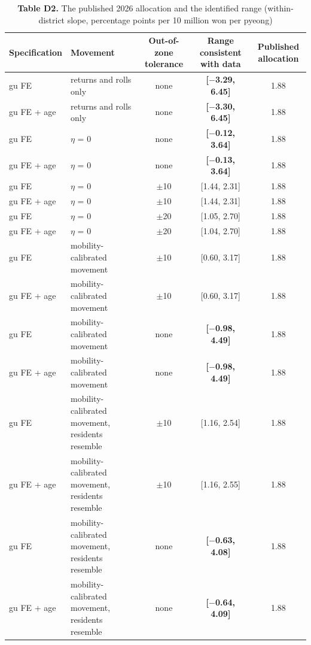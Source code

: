 \begin{table}[!htbp]
\centering
\scriptsize
\setlength{\tabcolsep}{3.5pt}
\caption*{\textbf{Table D2.} The published 2026 allocation and the identified range (within-district slope, percentage points per 10 million won per pyeong)}
\begin{tabularx}{\linewidth}{llccc}
\toprule
Specification & Movement & Out-of-zone tolerance & Range consistent with data & Published allocation \\
\midrule
gu FE & returns and rolls only & none & \textbf{[$-$3.29, 6.45]} & 1.88 \\
gu FE + age & returns and rolls only & none & \textbf{[$-$3.30, 6.45]} & 1.88 \\
gu FE & $\eta $ = 0 & none & \textbf{[$-$0.12, 3.64]} & 1.88 \\
gu FE + age & $\eta $ = 0 & none & \textbf{[$-$0.13, 3.64]} & 1.88 \\
gu FE & $\eta $ = 0 & $\pm $10 & [1.44, 2.31] & 1.88 \\
gu FE + age & $\eta $ = 0 & $\pm $10 & [1.44, 2.31] & 1.88 \\
gu FE & $\eta $ = 0 & $\pm $20 & [1.05, 2.70] & 1.88 \\
gu FE + age & $\eta $ = 0 & $\pm $20 & [1.04, 2.70] & 1.88 \\
gu FE & mobility-calibrated movement & $\pm $10 & [0.60, 3.17] & 1.88 \\
gu FE + age & mobility-calibrated movement & $\pm $10 & [0.60, 3.17] & 1.88 \\
gu FE & mobility-calibrated movement & none & \textbf{[$-$0.98, 4.49]} & 1.88 \\
gu FE + age & mobility-calibrated movement & none & \textbf{[$-$0.98, 4.49]} & 1.88 \\
gu FE & mobility-calibrated movement, residents resemble & $\pm $10 & [1.16, 2.54] & 1.88 \\
gu FE + age & mobility-calibrated movement, residents resemble & $\pm $10 & [1.16, 2.55] & 1.88 \\
gu FE & mobility-calibrated movement, residents resemble & none & \textbf{[$-$0.63, 4.08]} & 1.88 \\
gu FE + age & mobility-calibrated movement, residents resemble & none & \textbf{[$-$0.64, 4.09]} & 1.88 \\
\bottomrule
\end{tabularx}

\end{table}
